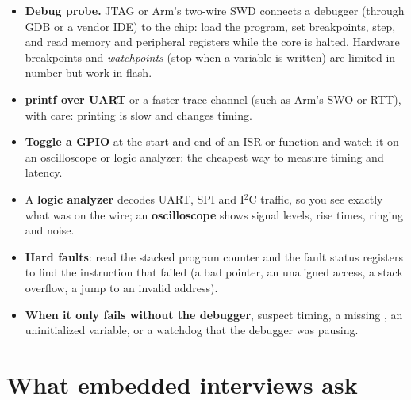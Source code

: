 \begin{itemize}
  \item \textbf{Debug probe.} JTAG or Arm's two-wire SWD connects a debugger (through GDB or a vendor IDE) to the chip: load the program, set breakpoints, step, and read memory and peripheral registers while the core is halted. Hardware breakpoints and \emph{watchpoints} (stop when a variable is written) are limited in number but work in flash.
  \item \textbf{printf over UART} or a faster trace channel (such as Arm's SWO or RTT), with care: printing is slow and changes timing.
  \item \textbf{Toggle a GPIO} at the start and end of an ISR or function and watch it on an oscilloscope or logic analyzer: the cheapest way to measure timing and latency.
  \item A \textbf{logic analyzer} decodes UART, SPI and I$^2$C traffic, so you see exactly what was on the wire; an \textbf{oscilloscope} shows signal levels, rise times, ringing and noise.
  \item \textbf{Hard faults}: read the stacked program counter and the fault status registers to find the instruction that failed (a bad pointer, an unaligned access, a stack overflow, a jump to an invalid address).
  \item \textbf{When it only fails without the debugger}, suspect timing, a missing , an uninitialized variable, or a watchdog that the debugger was pausing.
\end{itemize}

\section{What embedded interviews ask}

